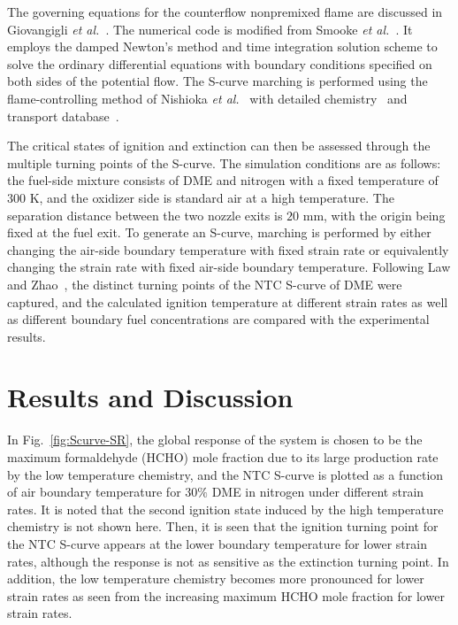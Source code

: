 \documentclass[review,3p,times]{elsarticleUS}
\begin{document}
The governing equations for the counterflow nonpremixed flame are discussed in Giovangigli \emph{et al.}~\cite{giovangigli87}. The numerical code is modified from Smooke \emph{et al.}~\cite{smooke86}. It employs the damped Newton’s method and time integration solution scheme to solve the ordinary differential equations with boundary conditions specified on both sides of the potential flow. The S-curve marching is performed using the flame-controlling method of Nishioka \emph{et al.}~\cite{nishioka96} with detailed chemistry~\cite{kee89} and transport database~\cite{kee83}.

The critical states of ignition and extinction can then be assessed through the multiple turning points of the S-curve. The simulation conditions are as follows: the fuel-side mixture consists of DME and nitrogen with a fixed temperature of $300$ K, and the oxidizer side is standard air at a high temperature. The separation distance between the two nozzle exits is $20$ mm, with the origin being fixed at the fuel exit. To generate an S-curve, marching is performed by either changing the air-side boundary temperature with fixed strain rate or equivalently changing the strain rate with fixed air-side boundary temperature. Following Law and Zhao~\cite{law12,zhao13}, the distinct turning points of the NTC S-curve of DME were captured, and the calculated ignition temperature at different strain rates as well as different boundary fuel concentrations are compared with the  experimental results.

\section{Results and Discussion}

In Fig.~\ref{fig:Scurve-SR}, the global response of the system is chosen to be the maximum formaldehyde (HCHO) mole fraction due to its large production rate by the low temperature chemistry, and the NTC S-curve is plotted as a function of air boundary temperature for $30\%$ DME in nitrogen under different strain rates. It is noted that the second ignition state induced by the high temperature chemistry is not shown here. Then, it is seen that the ignition turning point for the NTC S-curve appears at the lower boundary temperature for lower strain rates, although the response is not as sensitive as the extinction turning point. In addition, the low temperature chemistry becomes more pronounced for lower strain rates as seen from the increasing maximum HCHO mole fraction for lower strain rates.
\end{document}
